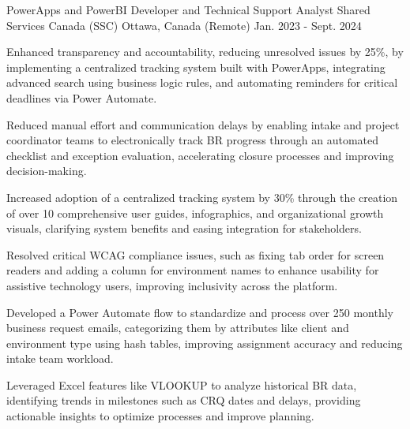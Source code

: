 

\begin{cventries}
\cventry
  {PowerApps and PowerBI Developer and Technical Support Analyst} %
  {Shared Services Canada (SSC)} %
  {Ottawa, Canada (Remote)} %
  {Jan. 2023 - Sept. 2024} %
  {
    \begin{cvitems} %
      \item {Enhanced transparency and accountability, reducing unresolved issues by 25\%, by implementing a centralized tracking system built with PowerApps, integrating advanced search using business logic rules, and automating reminders for critical deadlines via Power Automate.}
    
    \item {Reduced manual effort and communication delays by enabling intake and project coordinator teams to electronically track BR progress through an automated checklist and exception evaluation, accelerating closure processes and improving decision-making.}
    
    \item {Increased adoption of a centralized tracking system by 30\% through the creation of over 10 comprehensive user guides, infographics, and organizational growth visuals, clarifying system benefits and easing integration for stakeholders.}
    
    \item {Resolved critical WCAG compliance issues, such as fixing tab order for screen readers and adding a column for environment names to enhance usability for assistive technology users, improving inclusivity across the platform.}
    
    \item {Developed a Power Automate flow to standardize and process over 250 monthly business request emails, categorizing them by attributes like client and environment type using hash tables, improving assignment accuracy and reducing intake team workload.}
    
    \item {Leveraged Excel features like VLOOKUP to analyze historical BR data, identifying trends in milestones such as CRQ dates and delays, providing actionable insights to optimize processes and improve planning.}
    

\end{cvitems}}
\end{cventries}
